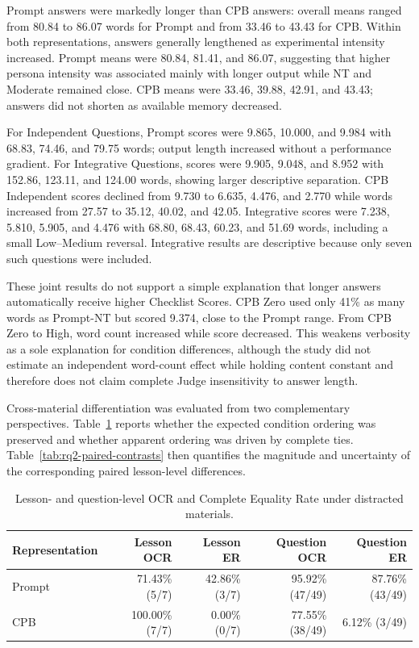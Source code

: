 Prompt answers were markedly longer than CPB answers: overall means ranged from 80.84 to 86.07 words for Prompt and from 33.46 to 43.43 for CPB. Within both representations, answers generally lengthened as experimental intensity increased. Prompt means were 80.84, 81.41, and 86.07, suggesting that higher persona intensity was associated mainly with longer output while NT and Moderate remained close. CPB means were 33.46, 39.88, 42.91, and 43.43; answers did not shorten as available memory decreased.

For Independent Questions, Prompt scores were 9.865, 10.000, and 9.984 with 68.83, 74.46, and 79.75 words; output length increased without a performance gradient. For Integrative Questions, scores were 9.905, 9.048, and 8.952 with 152.86, 123.11, and 124.00 words, showing larger descriptive separation. CPB Independent scores declined from 9.730 to 6.635, 4.476, and 2.770 while words increased from 27.57 to 35.12, 40.02, and 42.05. Integrative scores were 7.238, 5.810, 5.905, and 4.476 with 68.80, 68.43, 60.23, and 51.69 words, including a small Low--Medium reversal. Integrative results are descriptive because only seven such questions were included.

These joint results do not support a simple explanation that longer answers automatically receive higher Checklist Scores. CPB Zero used only 41\% as many words as Prompt-NT but scored 9.374, close to the Prompt range. From CPB Zero to High, word count increased while score decreased. This weakens verbosity as a sole explanation for condition differences, although the study did not estimate an independent word-count effect while holding content constant and therefore does not claim complete Judge insensitivity to answer length.

Cross-material differentiation was evaluated from two complementary perspectives. Table~\ref{tab:rq2-ordering} reports whether the expected condition ordering was preserved and whether apparent ordering was driven by complete ties. Table~\ref{tab:rq2-paired-contrasts} then quantifies the magnitude and uncertainty of the corresponding paired lesson-level differences.

\begin{table}[H]
\centering
\caption{Lesson- and question-level OCR and Complete Equality Rate under distracted materials.}
\label{tab:rq2-ordering}
\small
\begin{tabular}{lrrrr}
\toprule
\textbf{Representation} & \textbf{Lesson OCR} & \textbf{Lesson ER} & \textbf{Question OCR} & \textbf{Question ER} \\
\midrule
Prompt & 71.43\% (5/7) & 42.86\% (3/7) & 95.92\% (47/49) & 87.76\% (43/49) \\
CPB & 100.00\% (7/7) & 0.00\% (0/7) & 77.55\% (38/49) & 6.12\% (3/49) \\
\bottomrule
\end{tabular}
\end{table}

